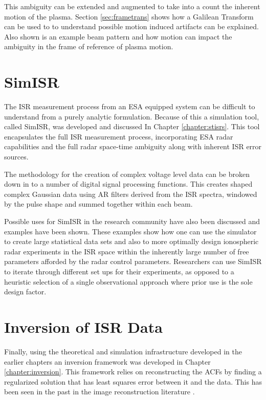 This ambiguity can be extended and augmented to take into a count the inherent motion of the plasma. Section \ref{sec:frametrans} shows how a Galilean Transform can be used to to understand possible motion induced artifacts can be explained. Also shown is an example beam pattern and how motion can impact the ambiguity in the frame of reference of plasma motion.

\section{SimISR}


The ISR measurement process from an ESA equipped system can be difficult to understand from a purely analytic formulation. Because of this a simulation tool, called SimISR, was developed and discussed In Chapter \ref{chapter:stisrs}. This tool encapsulates the full ISR measurement process, incorporating ESA radar capabilities and the full radar space-time ambiguity along with inherent ISR error sources. 

The methodology for the creation of complex voltage level data can be broken down in to a number of digital signal processing functions. This creates shaped complex Gaussian data using AR filters derived from the ISR spectra, windowed by the pulse shape and summed together within each beam.  

Possible uses for SimISR in the research community have also been discussed and examples have been shown. These examples show how one can use the simulator to create large statistical data sets and also to more optimally design ionospheric radar experiments in the ISR space within the inherently large number of free parameters afforded by the radar control parameters. Researchers can use SimISR to iterate through different set ups for their experiments, as opposed to a heuristic selection of a single observational approach where prior use is the sole design factor. 
 
\section{Inversion of ISR Data}


Finally, using the theoretical and simulation infrastructure developed in the earlier chapters an inversion framework was developed in Chapter \ref{chapter:inversion}. This framework relies on reconstructing the ACFs by finding a regularized solution that has least squares error between it and the data. This has been seen in the past in the image reconstruction literature \cite{Karl:2005jy}.

